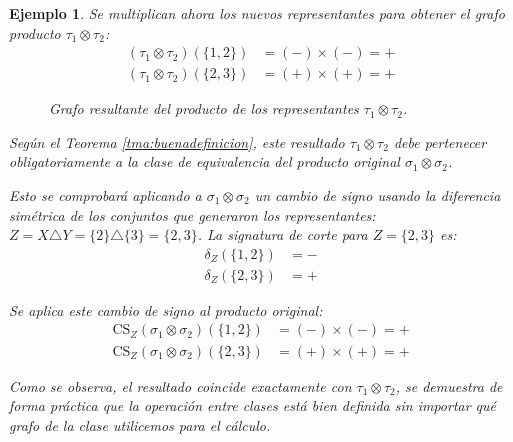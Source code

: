 \documentclass[11pt,a4paper,spanish]{report}
\theoremstyle{plain}
\newtheorem{ejemplo}{Ejemplo}[chapter]
\begin{document}
\begin{ejemplo}
Se multiplican ahora los nuevos representantes para obtener el grafo producto $\tau_1 \otimes \tau_2$:
\begin{align*}
(\tau_1 \otimes \tau_2)(\{1,2\}) &= (-)\times(-) = + \\
(\tau_1 \otimes \tau_2)(\{2,3\}) &= (+)\times(+) = +
\end{align*}

\begin{figure}[H]
\begin{center}
\end{center}
     \caption{{Grafo resultante del producto de los representantes $\tau_1 \otimes \tau_2$.}}
     \label{fig:ejemplo_producto_clases}
\end{figure}

Según el Teorema \ref{tma:buenadefinicion}, este resultado $\tau_1 \otimes \tau_2$ debe pertenecer obligatoriamente a la clase de equivalencia del producto original $\sigma_1 \otimes \sigma_2$. 

Esto se comprobará aplicando a $\sigma_1 \otimes \sigma_2$ un cambio de signo usando la diferencia simétrica de los conjuntos que generaron los representantes: $Z = X \triangle Y = \{2\} \triangle \{3\} = \{2,3\}$.
La signatura de corte para $Z=\{2,3\}$ es:
\begin{align*}
\delta_{Z}(\{1,2\}) &= - \\
\delta_{Z}(\{2,3\}) &= + 
\end{align*}

Se aplica este cambio de signo al producto original:
\begin{align*}
\mathrm{CS}_{Z}(\sigma_1 \otimes \sigma_2)(\{1,2\}) &= (-) \times (-) = + \\
\mathrm{CS}_{Z}(\sigma_1 \otimes \sigma_2)(\{2,3\}) &= (+) \times (+) = +
\end{align*}

Como se observa, el resultado coincide exactamente con $\tau_1 \otimes \tau_2$, se demuestra de forma práctica que la operación entre clases está bien definida sin importar qué grafo de la clase utilicemos para el cálculo.
\end{ejemplo}
\end{document}
